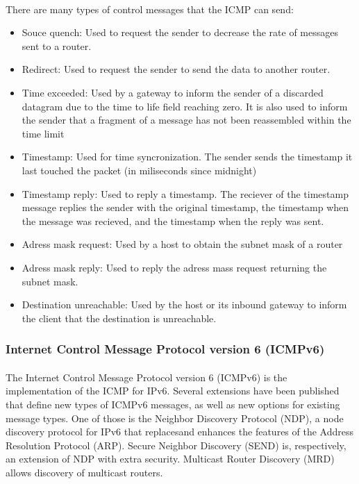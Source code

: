 \paragraph{}There are many types of control messages that the ICMP can send:
\begin{itemize}
\item Souce quench: Used to request the sender to decrease the rate of messages sent to a router.
\item Redirect: Used to request the sender to send the data to another router.
\item Time exceeded: Used by a gateway to inform the sender of a discarded datagram due to the time to life field reaching zero. It is also used to inform the sender that a fragment of a message has not been reassembled within the time limit
\item Timestamp: Used for time syncronization. The sender sends the timestamp it last touched the packet (in miliseconds since midnight)
\item Timestamp reply: Used to reply a timestamp. The reciever of the timestamp message replies the sender with the original timestamp, the timestamp when the message was recieved, and the timestamp when the reply was sent.
\item Adress mask request: Used by a host to obtain the subnet mask of a router
\item Adress mask reply: Used to reply the adress mass request returning the subnet mask.
\item Destination unreachable: Used by the host or its inbound gateway to inform the client that the destination is unreachable.
\end{itemize}

\subsubsection*{Internet Control Message Protocol version 6 (ICMPv6)\cite{ICMPv6}}
\paragraph{}The Internet Control Message Protocol version 6 (ICMPv6) is the implementation of the ICMP for IPv6. Several extensions have been published that define new types of ICMPv6 messages, as well as new options for existing message types. One of those is the Neighbor Discovery Protocol (NDP), a node discovery protocol for IPv6 that replacesand enhances the features of the Address Resolution Protocol (ARP). Secure Neighbor Discovery (SEND) is, respectively, an extension of NDP with extra security. Multicast Router Discovery (MRD) allows discovery of multicast routers.

